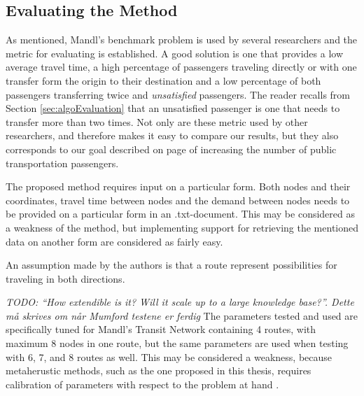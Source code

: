 \subsection{Evaluating the Method}

As mentioned, Mandl's benchmark problem is used by several researchers and the metric for evaluating is established. A good solution is one that provides a low average travel time, a high percentage of passengers traveling directly or with one transfer form the origin to their destination and a low percentage of both passengers transferring twice and \textit{unsatisfied} passengers. The reader recalls from Section \vref{sec:algoEvaluation} that an unsatisfied passenger is one that needs to transfer more than two times. Not only are these metric used by other researchers, and therefore makes it easy to compare our results, but they also corresponds to our goal described on page \pageref{itm:goal} of increasing  the number of public transportation passengers. 

The proposed method requires input on a particular form. Both nodes and their coordinates, travel time between nodes and the demand between nodes needs to be provided on a particular form in an .txt-document. This may be considered as a weakness of the method, but implementing support for retrieving the mentioned data on another form are considered as fairly easy. 

An assumption made by the authors is that a route represent possibilities for traveling in both directions. 

\emph{\color{blue} TODO: ``How extendible is it? Will it scale up to a large knowledge base?''. Dette må skrives om når Mumford testene er ferdig}
The parameters tested and used are specifically tuned for Mandl's Transit Network containing 4 routes, with maximum 8 nodes in one route, but the same parameters are used when testing with 6, 7, and 8 routes as well. This may be considered a weakness, because metaherustic methods, such as the one proposed in this thesis, requires calibration of parameters with respect to the problem at hand \citep{dobslaw09}. 

